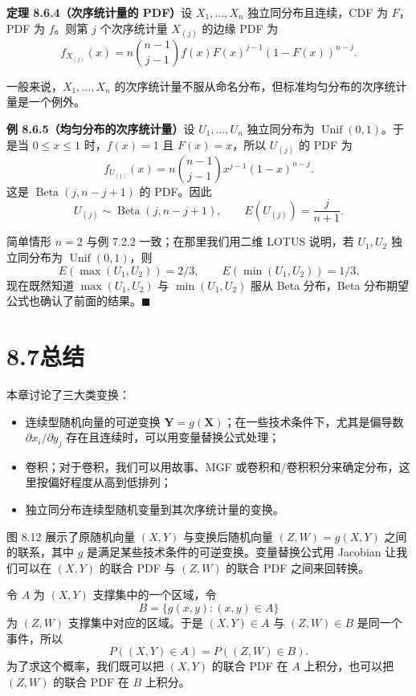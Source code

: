 \documentclass[UTF8,12pt,a4paper,fontset=fandol]{ctexart}
\begin{document}
\noindent\textbf{定理 8.6.4（次序统计量的 PDF）}\quad 设 $X_1,\ldots,X_n$ 独立同分布且连续，CDF 为 $F$，PDF 为 $f$。则第 $j$ 个次序统计量 $X_{(j)}$ 的边缘 PDF 为
\[
  f_{X_{(j)}}(x)
  =
  n{n-1\choose j-1}f(x)F(x)^{j-1}(1-F(x))^{n-j}.
\]

一般来说，$X_1,\ldots,X_n$ 的次序统计量不服从命名分布，但标准均匀分布的次序统计量是一个例外。

\noindent\textbf{例 8.6.5（均匀分布的次序统计量）}\quad 设 $U_1,\ldots,U_n$ 独立同分布为 $\operatorname{Unif}(0,1)$。于是当 $0\le x\le1$ 时，$f(x)=1$ 且 $F(x)=x$，所以 $U_{(j)}$ 的 PDF 为
\[
  f_{U_{(j)}}(x)
  =
  n{n-1\choose j-1}x^{j-1}(1-x)^{n-j}.
\]
这是 $\operatorname{Beta}(j,n-j+1)$ 的 PDF。因此
\[
  U_{(j)}\sim\operatorname{Beta}(j,n-j+1),
  \qquad
  E(U_{(j)})=\frac{j}{n+1}.
\]

简单情形 $n=2$ 与例 7.2.2 一致；在那里我们用二维 LOTUS 说明，若 $U_1,U_2$ 独立同分布为 $\operatorname{Unif}(0,1)$，则
\[
  E(\max(U_1,U_2))=2/3,\qquad
  E(\min(U_1,U_2))=1/3.
\]
现在既然知道 $\max(U_1,U_2)$ 与 $\min(U_1,U_2)$ 服从 Beta 分布，Beta 分布期望公式也确认了前面的结果。$\blacksquare$

\section*{8.7\quad 总结}

本章讨论了三大类变换：
\begin{itemize}
  \item 连续型随机向量的可逆变换 $\mathbf Y=g(\mathbf X)$；在一些技术条件下，尤其是偏导数 $\partial x_i/\partial y_j$ 存在且连续时，可以用变量替换公式处理；
  \item 卷积；对于卷积，我们可以用故事、MGF 或卷积和/卷积积分来确定分布，这里按偏好程度从高到低排列；
  \item 独立同分布连续型随机变量到其次序统计量的变换。
\end{itemize}

图 8.12 展示了原随机向量 $(X,Y)$ 与变换后随机向量 $(Z,W)=g(X,Y)$ 之间的联系，其中 $g$ 是满足某些技术条件的可逆变换。变量替换公式用 Jacobian 让我们可以在 $(X,Y)$ 的联合 PDF 与 $(Z,W)$ 的联合 PDF 之间来回转换。

令 $A$ 为 $(X,Y)$ 支撑集中的一个区域，令
\[
  B=\{g(x,y):(x,y)\in A\}
\]
为 $(Z,W)$ 支撑集中对应的区域。于是 $(X,Y)\in A$ 与 $(Z,W)\in B$ 是同一个事件，所以
\[
  P((X,Y)\in A)=P((Z,W)\in B).
\]
为了求这个概率，我们既可以把 $(X,Y)$ 的联合 PDF 在 $A$ 上积分，也可以把 $(Z,W)$ 的联合 PDF 在 $B$ 上积分。
\end{document}
